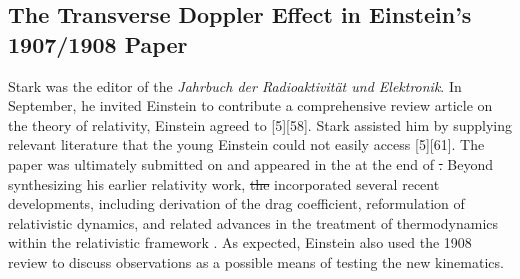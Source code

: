 \documentclass[submitted,12pt]{article} %
\newcommand{\TDE}{Transverse Doppler Effect\xspace}
\providecommand{\DIFadd}[1]{{\protect\color{blue}\uwave{#1}}} %
\providecommand{\DIFdel}[1]{{\protect\color{red}\sout{#1}}}                      %
\providecommand{\DIFaddbegin}{} %
\providecommand{\DIFaddend}{} %
\providecommand{\DIFdelbegin}{} %
\providecommand{\DIFdelend}{} %
\begin{document}



\subsection{The \TDE{} in Einstein’s 1907/1908  Paper}
%
Stark was the editor of the \emph{Jahrbuch der Radioaktivität und Elektronik}. In September, he invited Einstein to contribute a comprehensive review article on the theory of relativity, \DIFaddbegin \DIFadd{and }\DIFaddend Einstein agreed to  [5][58]. Stark assisted him by supplying relevant literature that the young Einstein could not easily access [5][61]. The paper was ultimately submitted on  and appeared in the \DIFdelbegin %
\DIFdelend \DIFaddbegin {} \DIFaddend at the end of \DIFdelbegin %
\DIFdel{. }\DIFdelend \DIFaddbegin \DIFadd{January~1908. }\DIFaddend Beyond synthesizing his earlier relativity work, \DIFdelbegin \DIFdel{the }\DIFdelend \citet{Einstein1908} incorporated several recent developments, including  derivation of the drag coefficient,  reformulation of relativistic dynamics, and related advances in the treatment of thermodynamics within the relativistic framework \citep{Planck1907}. As expected, Einstein also used the 1908 review to discuss  observations as a possible means of testing the new kinematics.
\end{document}
